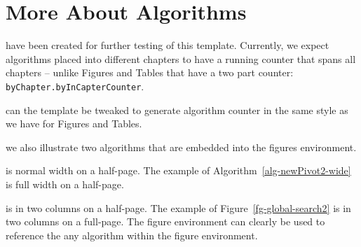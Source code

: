 \chapter{More About Algorithms}
\label{chap-Algorithms2}
 have been created for further testing
of this template.
Currently, we expect algorithms placed into different chapters to
have a running counter that spans all chapters -- unlike Figures and Tables
that have a two part counter: {\tt byChapter.byInCapterCounter}.

 can the template be tweaked to generate algorithm counter
in the same style as we have for Figures and Tables.

 we also illustrate two algorithms that are embedded into the figures environment. 

 is normal width on a half-page.
The example of Algorithm~\ref{alg-newPivot2-wide}   is full   width on a half-page.

 is in two columns on a half-page.
The example of Figure~\ref{fg-global-search2} is in two columns on a full-page.
The figure environment can clearly be used to reference the any algorithm within the figure environment.

 \lipsum[4]

\clearpage





\clearpage

\lipsum[4]
\lipsum[4]


